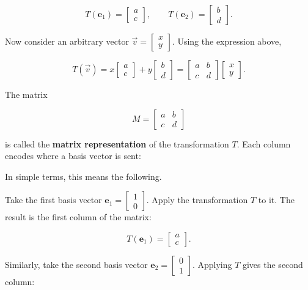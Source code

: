 \documentclass[11pt,openany]{book}
\theoremstyle{definition}
\begin{document}
\[
T(\mathbf{e}_1) = \begin{bmatrix} a \\ c \end{bmatrix}, 
\qquad
T(\mathbf{e}_2) = \begin{bmatrix} b \\ d \end{bmatrix}.
\]

Now consider an arbitrary vector $\vec{v} = \begin{bmatrix} x \\ y \end{bmatrix}$. 
Using the expression above,

\[
T(\vec{v}) = x \begin{bmatrix} a \\ c \end{bmatrix} + y \begin{bmatrix} b \\ d \end{bmatrix}
=
\begin{bmatrix}
a & b \\
c & d
\end{bmatrix}
\begin{bmatrix}
x \\
y
\end{bmatrix}.
\]

The matrix

\[
M =
\begin{bmatrix}
a & b \\
c & d
\end{bmatrix}
\]

is called the \textbf{matrix representation} of the transformation $T$. Each column encodes 
where a basis vector is sent:

In simple terms, this means the following.

\medskip

Take the first basis vector $\mathbf{e}_1 = \begin{bmatrix}1 \\ 0\end{bmatrix}$. 
Apply the transformation $T$ to it. The result is the first column of the matrix:

\[
T(\mathbf{e}_1) = \begin{bmatrix} a \\ c \end{bmatrix}.
\]

\medskip

Similarly, take the second basis vector $\mathbf{e}_2 = \begin{bmatrix}0 \\ 1\end{bmatrix}$. 
Applying $T$ gives the second column:
\end{document}
